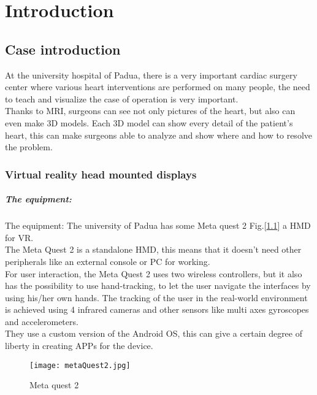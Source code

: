 
\chapter{Introduction}
\label{chp:intro}

\section{Case introduction}
\noindent
At the university hospital of Padua, 
there is a very important cardiac surgery center where various heart interventions are performed on many people,
the need to teach and visualize the case of operation is very important. \\
Thanks to MRI, surgeons can see not only pictures of the heart, but also can even make 3D models.
Each 3D model can show every detail of the patient's heart, this can make surgeons able to analyze and show where and how to resolve the problem.

\subsection{Virtual reality head mounted displays}

\paragraph{The equipment:}
The equipment: The university of Padua has some Meta quest 2 Fig.[\ref{fig:metaQuest2}] a \ac{HMD} for \ac{VR}.\\ 
The Meta Quest 2 is a standalone \ac{HMD}, this means that it doesn't need other peripherals like an external console or \ac{PC} for working.\\
For user interaction, the Meta Quest 2 uses two wireless controllers, but it also has the possibility to use hand-tracking, to let the user navigate the interfaces by using his/her own hands.
The tracking of the user in the real-world environment is achieved using 4 infrared cameras and other sensors like multi axes gyroscopes and accelerometers.\\
They use a custom version of the Android \ac{OS}, this can give a certain degree of liberty in creating APPs for the device.

\begin{figure}[ht]
  \centering
  \texttt{[image: metaQuest2.jpg]}
  \caption{Meta quest 2}
  \label{fig:metaQuest2}
\end{figure}

